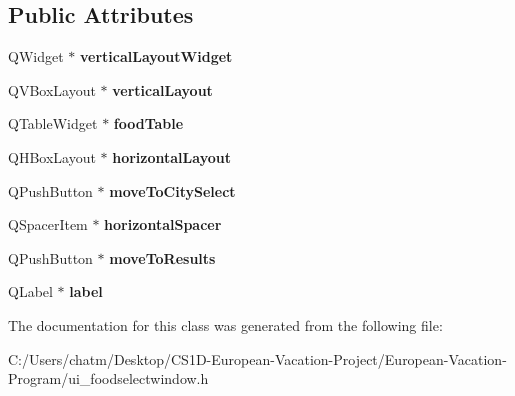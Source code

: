 \subsection*{Public Attributes}
\begin{DoxyCompactItemize}
\item 
\mbox{\label{class_ui___food_select_window_a84eb5a912e3478f5174fe544b7b142a1}} 
Q\+Widget $\ast$ {\bfseries vertical\+Layout\+Widget}
\item 
\mbox{\label{class_ui___food_select_window_a436b18f08819d366a22a9b477e016446}} 
Q\+V\+Box\+Layout $\ast$ {\bfseries vertical\+Layout}
\item 
\mbox{\label{class_ui___food_select_window_abddd1172ee154f7cb0635e1797d6c5f7}} 
Q\+Table\+Widget $\ast$ {\bfseries food\+Table}
\item 
\mbox{\label{class_ui___food_select_window_aee63099c737b32aa4206452a7ff8c025}} 
Q\+H\+Box\+Layout $\ast$ {\bfseries horizontal\+Layout}
\item 
\mbox{\label{class_ui___food_select_window_a6d7e3e7bf1bc994438582bf3a7462952}} 
Q\+Push\+Button $\ast$ {\bfseries move\+To\+City\+Select}
\item 
\mbox{\label{class_ui___food_select_window_a8d173cbe609d6a9951c343f20f2d1afd}} 
Q\+Spacer\+Item $\ast$ {\bfseries horizontal\+Spacer}
\item 
\mbox{\label{class_ui___food_select_window_aabf2f0f4d6761c9507f88e0033e87f95}} 
Q\+Push\+Button $\ast$ {\bfseries move\+To\+Results}
\item 
\mbox{\label{class_ui___food_select_window_aa9247a4556eac5f314fabf523b1bcf98}} 
Q\+Label $\ast$ {\bfseries label}
\end{DoxyCompactItemize}


The documentation for this class was generated from the following file\+:\begin{DoxyCompactItemize}
\item 
C\+:/\+Users/chatm/\+Desktop/\+C\+S1\+D-\/\+European-\/\+Vacation-\/\+Project/\+European-\/\+Vacation-\/\+Program/ui\+\_\+foodselectwindow.\+h\end{DoxyCompactItemize}
